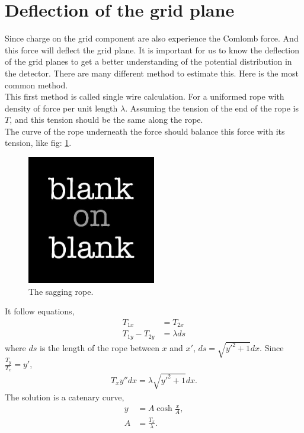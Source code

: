 \section{Deflection of the grid plane}
Since charge on the grid component are also experience the Comlomb force. And this force will deflect the grid plane. It is important for us to know the deflection of the grid planes to get a better understanding of the potential distribution in the detector. There are many different method to estimate this. Here is the most common method.
\\
This first method is called single wire calculation. For a uniformed rope with density of force per unit length $\lambda$. Assuming the tension of the end of the rope is $T$, and this tension should be the same along the rope.
\\
The curve of the rope underneath the force should balance this force with its tension, like fig: \ref{fig: sag rope}. 
\begin{figure}
\centering
\includegraphics[width=0.5\textwidth]{blank.jpg}
\caption{The sagging rope.}
\label{fig: sag rope}
\end{figure}
It follow equations,
\begin{align}
T_{1x} & = T_{2x} \\
T_{1y} - T_{2y} & = \lambda ds  
\end{align}
where $ds$ is the length of the rope between $x$ and $x'$, $ds = \sqrt{y'^2+1} dx$. Since $\frac{T_y}{T_x} =y'$, 
\begin{align}
T_{x} y'' dx = \lambda \sqrt{y'^2+1} dx.
\end{align}
The solution is a catenary curve,
\begin{align}
y & = A \cosh \frac{x}{A}, \\
A & = \frac{T_{x}}{\lambda}.
\end{align}
\\
